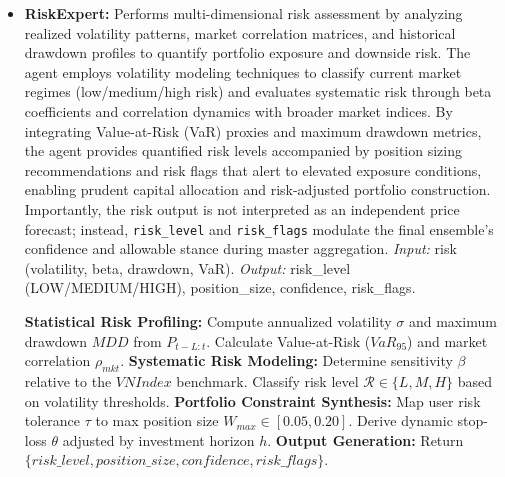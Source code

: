 \documentclass{ieeeaccess}
\begin{document}
\begin{itemize}
    \item \textbf{RiskExpert:} 
    Performs multi-dimensional risk assessment by analyzing realized volatility patterns, market correlation matrices, and historical drawdown profiles to quantify portfolio exposure and downside risk. The agent employs volatility modeling techniques to classify current market regimes (low/medium/high risk) and evaluates systematic risk through beta coefficients and correlation dynamics with broader market indices. By integrating Value-at-Risk (VaR) proxies and maximum drawdown metrics, the agent provides quantified risk levels accompanied by position sizing recommendations and risk flags that alert to elevated exposure conditions, enabling prudent capital allocation and risk-adjusted portfolio construction.  
    Importantly, the risk output is not interpreted as an independent price forecast; instead, \texttt{risk\_level} and \texttt{risk\_flags} modulate the final ensemble's confidence and allowable stance during master aggregation.
    \textit{Input:} risk (volatility, beta, drawdown, VaR).  
    \textit{Output:} risk\_level (LOW/MEDIUM/HIGH), position\_size, confidence, risk\_flags.

    \begin{algorithm}[H]
    \caption{RiskExpert multi-dimensional assessment}
    \begin{algorithmic}[1]
    \STATE \textbf{Statistical Risk Profiling:}
    \STATE \quad Compute annualized volatility $\sigma$ and maximum drawdown $MDD$ from $P_{t-L:t}$.
    \STATE \quad Calculate Value-at-Risk ($VaR_{95}$) and market correlation $\rho_{mkt}$.
    \STATE \textbf{Systematic Risk Modeling:}
    \STATE \quad Determine sensitivity $\beta$ relative to the $VNIndex$ benchmark.
    \STATE \quad Classify risk level $\mathcal{R} \in \{L, M, H\}$ based on volatility thresholds.
    \STATE \textbf{Portfolio Constraint Synthesis:}
    \STATE \quad Map user risk tolerance $\tau$ to max position size $W_{max} \in [0.05, 0.20]$.
    \STATE \quad Derive dynamic stop-loss $\theta$ adjusted by investment horizon $h$.
    \STATE \textbf{Output Generation:}
    \STATE \quad Return $\{risk\_level, position\_size, confidence, risk\_flags\}$.
    \end{algorithmic}
    \end{algorithm}


\end{itemize}
\end{document}
